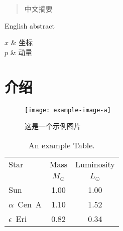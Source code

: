 \documentclass{YNUthesis}
\begin{document}

\begin{abstract}
  中文摘要
\end{abstract}

\begin{abstract*}
  English abstract
\end{abstract*}

\frontmatter

\tableofcontents
\listoffigures
\listoftables

\begin{notation}[ll]
  $x$                  & 坐标        \\
  $p$                  & 动量        \\
\end{notation}

\mainmatter

%   
%   
%   

\chapter{介绍}

\zhlipsum

\begin{figure}[htbp]
  \centering
  \texttt{[image: example-image-a]}%
  \caption{这是一个示例图片}
  \label{fig:一个示例图片}
\end{figure}

\zhlipsum

\begin{table}[htbp]
  \centering
  \caption{An example Table.}
  \label{tab:example-tab}
  \begin{tabular}{lcc}
  \toprule
  Star & Mass & Luminosity\\
  & $M_{\odot}$ & $L_{\odot}$\\
  \midrule
  Sun & 1.00 & 1.00\\
  $\alpha$~Cen~A & 1.10 & 1.52\\
  $\epsilon$~Eri & 0.82 & 0.34\\
  \bottomrule
  \end{tabular}
\end{table}
\end{document}
